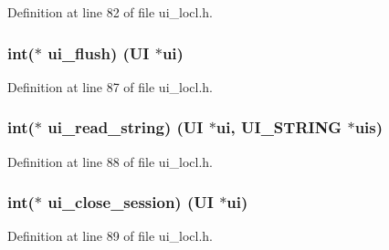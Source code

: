 Definition at line 82 of file ui\+\_\+locl.\+h.

\subsubsection[{\texorpdfstring{ui\+\_\+flush}{ui_flush}}]{\setlength{\rightskip}{0pt plus 5cm}int($\ast$ ui\+\_\+flush) ({\bf UI} $\ast$ui)}\hypertarget{structui__method__st_a3df0fea4eab137d6b5ccbe2056346a82}{}\label{structui__method__st_a3df0fea4eab137d6b5ccbe2056346a82}


Definition at line 87 of file ui\+\_\+locl.\+h.

\subsubsection[{\texorpdfstring{ui\+\_\+read\+\_\+string}{ui_read_string}}]{\setlength{\rightskip}{0pt plus 5cm}int($\ast$ ui\+\_\+read\+\_\+string) ({\bf UI} $\ast$ui, {\bf U\+I\+\_\+\+S\+T\+R\+I\+NG} $\ast$uis)}\hypertarget{structui__method__st_aa2112a3101f630bcfd5b05ed2d688a96}{}\label{structui__method__st_aa2112a3101f630bcfd5b05ed2d688a96}


Definition at line 88 of file ui\+\_\+locl.\+h.

\subsubsection[{\texorpdfstring{ui\+\_\+close\+\_\+session}{ui_close_session}}]{\setlength{\rightskip}{0pt plus 5cm}int($\ast$ ui\+\_\+close\+\_\+session) ({\bf UI} $\ast$ui)}\hypertarget{structui__method__st_a43c348f8c59960a5b687512088a46a7d}{}\label{structui__method__st_a43c348f8c59960a5b687512088a46a7d}


Definition at line 89 of file ui\+\_\+locl.\+h.

